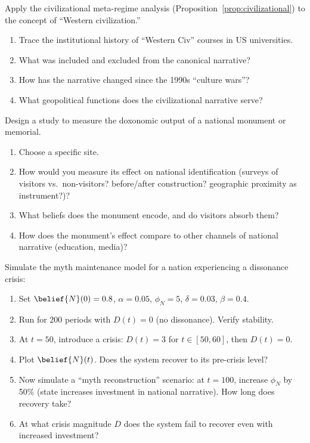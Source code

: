 \begin{exercise}
Apply the civilizational meta-regime analysis (Proposition~\ref{prop:civilizational}) to the concept of ``Western civilization.''
\begin{enumerate}[nosep]
  \item Trace the institutional history of ``Western Civ'' courses in US universities.
  \item What was included and excluded from the canonical narrative?
  \item How has the narrative changed since the 1990s ``culture wars''?
  \item What geopolitical functions does the civilizational narrative serve?
\end{enumerate}
\end{exercise}

\begin{exercise}
Design a study to measure the doxonomic output of a national monument or memorial.
\begin{enumerate}[nosep]
  \item Choose a specific site.
  \item How would you measure its effect on national identification (surveys of visitors vs.\ non-visitors? before/after construction? geographic proximity as instrument?)?
  \item What beliefs does the monument encode, and do visitors absorb them?
  \item How does the monument's effect compare to other channels of national narrative (education, media)?
\end{enumerate}
\end{exercise}

\begin{exercise}[Computational]
Simulate the myth maintenance model for a nation experiencing a dissonance crisis:
\begin{enumerate}[nosep]
  \item Set $\belief{N}(0) = 0.8$, $\alpha = 0.05$, $\phi_N = 5$, $\delta = 0.03$, $\beta = 0.4$.
  \item Run for 200 periods with $D(t) = 0$ (no dissonance). Verify stability.
  \item At $t = 50$, introduce a crisis: $D(t) = 3$ for $t \in [50, 60]$, then $D(t) = 0$.
  \item Plot $\belief{N}(t)$. Does the system recover to its pre-crisis level?
  \item Now simulate a ``myth reconstruction'' scenario: at $t = 100$, increase $\phi_N$ by 50\% (state increases investment in national narrative). How long does recovery take?
  \item At what crisis magnitude $D$ does the system fail to recover even with increased investment?
\end{enumerate}
\end{exercise}
